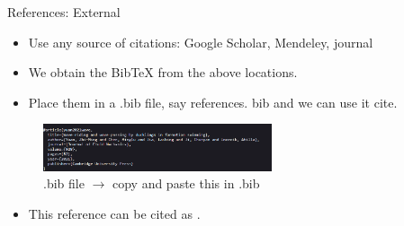 \begin{frame}{References: External}
 \begin{itemize}
     \item Use any source of citations: Google Scholar, Mendeley, journal
     \item We obtain the BibTeX from the above locations.
     \item Place them in a .bib file, say references. bib and we can use it cite.
 \end{itemize}
 \begin{figure}
     \centering
     \includegraphics[width=0.6\textwidth]{sections/citation03.PNG}
     \caption{.bib file $\rightarrow$ copy and paste this in .bib}
     \label{Bibtex}
 \end{figure}
  \begin{itemize}
     \item<1-> This reference can be cited as  \cite{yuan2021wave}.
 \end{itemize}
 \end{frame}